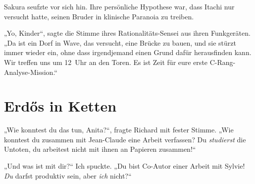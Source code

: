 Sakura seufzte vor sich hin. Ihre persönliche Hypothese war, dass Itachi nur versucht hatte, seinen Bruder in klinische Paranoia zu treiben.

„Yo, Kinder“, sagte die Stimme ihres Rationalitäts-Sensei aus ihren Funkgeräten. „Da ist ein Dorf in Wave, das versucht, eine Brücke zu bauen, und sie stürzt immer wieder ein, ohne dass irgendjemand einen Grund dafür herausfinden kann. Wir treffen uns um 12~Uhr an den Toren. Es ist Zeit für eure erste C-Rang-Analyse-Mission.“

\section{Erdős in Ketten}

„Wie konntest du das tun, Anita?“, fragte Richard mit fester Stimme. „Wie konntest du zusammen mit Jean-Claude eine Arbeit verfassen? Du \emph{studierst} die Untoten, du arbeitest nicht mit ihnen an Papieren zusammen!“

„Und was ist mit dir?“ Ich spuckte. „Du bist Co-Autor einer Arbeit mit Sylvie! \emph{Du} darfst produktiv sein, aber \emph{ich} nicht?“

